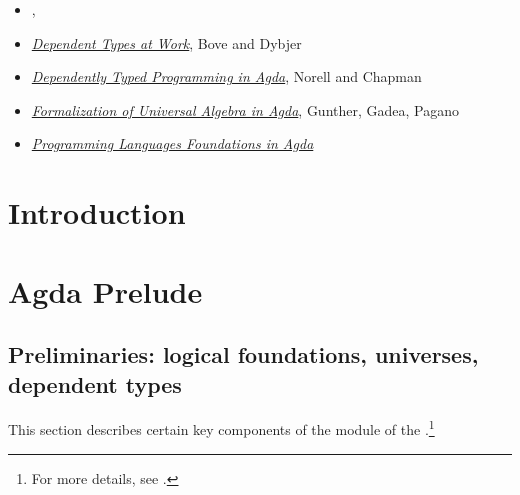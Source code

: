 \documentclass[a4paper,UKenglish,cleveref,autoref,thm-restate]{../lipics-v2021-wjd}
\begin{document}
\begin{itemize}
\item \textit{\ufcourse}, \escardo~\cite{MHE}
\item \href{http://www.cse.chalmers.se/~peterd/papers/DependentTypesAtWork.pdf}{\it Dependent Types at Work}, Bove and Dybjer~\cite{Bove:2009}
\item \href{http://www.cse.chalmers.se/~ulfn/papers/afp08/tutorial.pdf}{\it Dependently Typed Programming in Agda}, Norell and Chapman~\cite{Norell:2008}
\item \href{http://www.sciencedirect.com/science/article/pii/S1571066118300768}{\it Formalization of Universal Algebra in Agda}, Gunther, Gadea, Pagano~\cite{Gunther:2018}
\item \href{https://plfa.github.io/}{\it Programming Languages Foundations in Agda}~\cite{Wadler:2020}
\end{itemize}




\newpage %

\setcounter{tocdepth}{2}
\tableofcontents


\section{Introduction}\label{sec:introduction}


\newcommand\firstsentence[2]{This section describes certain key components of the #1 module of the \agdaualib.\footnote{For more details, see #2.}}





\section{Agda Prelude}\label{sec:agda-prelude}

\subsection{Preliminaries: logical foundations, universes, dependent types}\label{preliminaries}\firstsentence{\ualibPreliminaries}{\urlPreliminaries}

\end{document}
